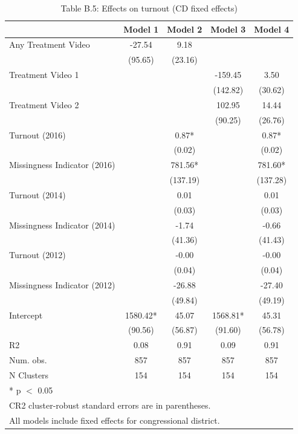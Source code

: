 \begin{table}
\centering
\caption{Table B.5: Effects on turnout (CD fixed effects)}
\centering
\begin{tabular}[t]{lcccc}
\toprule
  & Model 1 & Model 2 & Model 3 & Model 4\\
\midrule
Any Treatment Video & -27.54 & 9.18 &  & \\
 & (95.65) & (23.16) &  & \\
Treatment Video 1 &  &  & -159.45 & 3.50\\
 &  &  & (142.82) & (30.62)\\
Treatment Video 2 &  &  & 102.95 & 14.44\\
 &  &  & (90.25) & (26.76)\\
Turnout (2016) &  & 0.87* &  & 0.87*\\
 &  & (0.02) &  & (0.02)\\
Missingness Indicator (2016) &  & 781.56* &  & 781.60*\\
 &  & (137.19) &  & (137.28)\\
Turnout (2014) &  & 0.01 &  & 0.01\\
 &  & (0.03) &  & (0.03)\\
Missingness Indicator (2014) &  & -1.74 &  & -0.66\\
 &  & (41.36) &  & (41.43)\\
Turnout (2012) &  & -0.00 &  & -0.00\\
 &  & (0.04) &  & (0.04)\\
Missingness Indicator (2012) &  & -26.88 &  & -27.40\\
 &  & (49.84) &  & (49.19)\\
Intercept & 1580.42* & 45.07 & 1568.81* & 45.31\\
 & (90.56) & (56.87) & (91.60) & (56.78)\\
\midrule
R2 & 0.08 & 0.91 & 0.09 & 0.91\\
Num. obs. & 857 & 857 & 857 & 857\\
N Clusters & 154 & 154 & 154 & 154\\
\bottomrule
\multicolumn{5}{l}{\rule{0pt}{1em}* p $<$ 0.05}\\
\multicolumn{5}{l}{\rule{0pt}{1em}CR2 cluster-robust standard errors are in parentheses.}\\
\multicolumn{5}{l}{\rule{0pt}{1em}All models include fixed effects for congressional district.}\\
\end{tabular}
\end{table}
